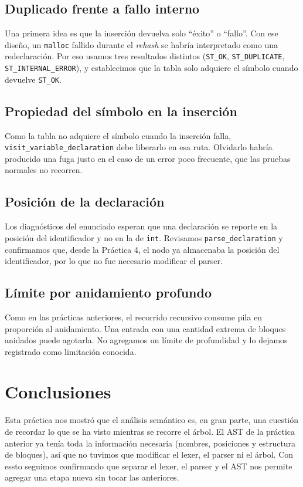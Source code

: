 \documentclass[12pt,letterpaper]{article}
\begin{document}
\subsection*{Duplicado frente a fallo interno}

Una primera idea es que la inserción devuelva solo ``éxito'' o ``fallo''. Con ese diseño, un \texttt{malloc}
fallido durante el \emph{rehash} se habría interpretado como una redeclaración. Por eso usamos tres
resultados distintos (\texttt{ST\_OK}, \texttt{ST\_DUPLICATE}, \texttt{ST\_INTERNAL\_ERROR}), y establecimos
que la tabla solo adquiere el símbolo cuando devuelve \texttt{ST\_OK}.

\subsection*{Propiedad del símbolo en la inserción}

Como la tabla no adquiere el símbolo cuando la inserción falla, \texttt{visit\_variable\_declaration} debe
liberarlo en esa ruta. Olvidarlo habría producido una fuga justo en el caso de un error poco frecuente, que
las pruebas normales no recorren.

\subsection*{Posición de la declaración}

Los diagnósticos del enunciado esperan que una declaración se reporte en la posición del identificador y no
en la de \texttt{int}. Revisamos \texttt{parse\_declaration} y confirmamos que, desde la Práctica 4, el nodo
ya almacenaba la posición del identificador, por lo que no fue necesario modificar el parser.

\subsection*{Límite por anidamiento profundo}

Como en las prácticas anteriores, el recorrido recursivo consume pila en proporción al anidamiento. Una
entrada con una cantidad extrema de bloques anidados puede agotarla. No agregamos un límite de profundidad y
lo dejamos registrado como limitación conocida.

\section*{Conclusiones}
Esta práctica nos mostró que el análisis semántico es, en gran parte, una cuestión de recordar lo que se ha
visto mientras se recorre el árbol. El AST de la práctica anterior ya tenía toda la información necesaria
(nombres, posiciones y estructura de bloques), así que no tuvimos que modificar el lexer, el parser ni el
árbol. Con essto seguimos confirmando que separar el lexer, el parser y el AST nos permite agregar una etapa
nueva sin tocar las anteriores.\\
\end{document}
